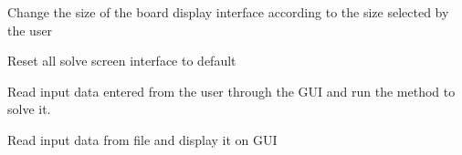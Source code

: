 \documentclass[letterpaper,10pt,english]{sphinxmanual}
\begin{document}
\begin{fulllineitems}

\begin{fulllineitems}
\label{\detokenize{main:main.PyramidsWindow.renewBoard}}
\pysigstartsignatures
{}
\pysigstopsignatures
\sphinxAtStartPar
Change the size of the board display interface
according to the size selected by the user

\end{fulllineitems}


\begin{fulllineitems}
\label{\detokenize{main:main.PyramidsWindow.resetBoard}}
\pysigstartsignatures
{}
\pysigstopsignatures
\sphinxAtStartPar
Reset all solve screen interface to default

\end{fulllineitems}


\begin{fulllineitems}
\label{\detokenize{main:main.PyramidsWindow.getInputData}}
\pysigstartsignatures
{}
\pysigstopsignatures
\sphinxAtStartPar
Read input data entered from the user through the GUI
and run the method to solve it.

\end{fulllineitems}


\begin{fulllineitems}
\label{\detokenize{main:main.PyramidsWindow.getDataFrFile}}
\pysigstartsignatures
{}
\pysigstopsignatures
\sphinxAtStartPar
Read input data from file and display it on GUI

\end{fulllineitems}



\end{fulllineitems}
\end{document}

